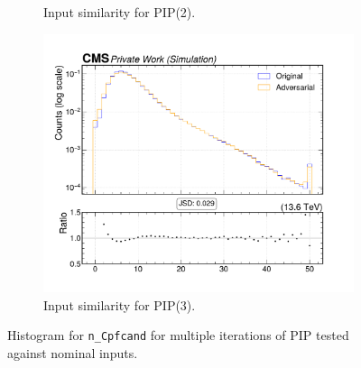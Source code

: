 \begin{figure}[htbp]
\begin{subfigure}[t]{0.32\textwidth}
    \caption{Input similarity for PIP(2).}
  \end{subfigure}\hfill
  \begin{subfigure}[t]{0.32\textwidth}
    \includegraphics[width=\linewidth]{media/output/features/compare/intprob_3/cmp_global_features_n_Cpfcand.pdf}
    \caption{Input similarity for PIP(3).}
  \end{subfigure}

  \caption{Histogram for \texttt{n\_Cpfcand} for multiple iterations of PIP tested against nominal inputs.}
  \label{fig:intprob_input_n_Cpfcand}
\end{figure}
